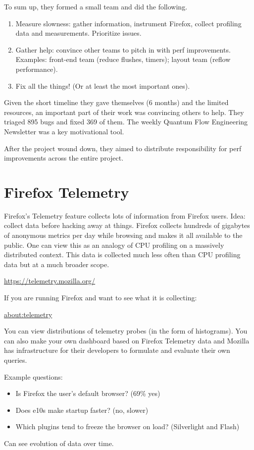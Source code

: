 \documentclass[a4paper]{report}
\begin{document}
To sum up, they formed a small team and did the following.
\begin{enumerate}[noitemsep]
\item Measure slowness: gather information, instrument Firefox, collect profiling data and measurements. Prioritize issues.
\item Gather help: convince other teams to pitch in with perf improvements. Examples: front-end team (reduce flushes, timers); layout team (reflow performance).
\item Fix all the things! (Or at least the most important ones).
\end{enumerate}
Given the short timeline they gave themselves (6 months) and the limited resources, an important part of their work was convincing others to help.
They triaged 895 bugs and fixed 369 of them. The weekly Quantum Flow Engineering Newsletter was a key motivational tool.

After the project wound down, they aimed to distribute responsibility for perf improvements across the entire project.

\section*{Firefox Telemetry}
Firefox's Telemetry feature collects lots of information from Firefox
users.  Idea: collect data before hacking away at things.  Firefox collects hundreds of
gigabytes of anonymous metrics per day while browsing and makes it all available to
the public.  One can view this as an analogy of CPU profiling on a
massively distributed context. This data is collected much less often than
CPU profiling data but at a much broader scope.
\begin{center}
\url{https://telemetry.mozilla.org/}
\end{center}
If you are running Firefox and want to see what it is collecting:
\begin{center}
\url{about:telemetry}
\end{center}

You can view distributions of telemetry probes (in the form of
histograms). You can also make your own dashboard based on Firefox
Telemetry data and Mozilla has infrastructure for their developers to
formulate and evaluate their own queries.

Example questions:
\begin{itemize}[noitemsep]
\item Is Firefox the user's default browser? (69\% yes)
\item Does e10s make startup faster? (no, slower)
\item Which plugins tend to freeze the browser on load? (Silverlight and Flash)
\end{itemize}
Can see evolution of data over time.
\end{document}
